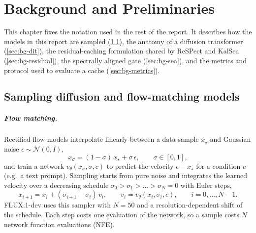 \chapter{Background and Preliminaries}\label{ch:background}

This chapter fixes the notation used in the rest of the report. It describes how the models in this report are sampled (\cref{sec:bg-flow}), the anatomy of a diffusion transformer (\cref{sec:bg-dit}), the residual-caching formulation shared by ReSPect and KalSea (\cref{sec:bg-residual}), the spectrally aligned gate (\cref{sec:bg-sea}), and the metrics and protocol used to evaluate a cache (\cref{sec:bg-metrics}).

\section{Sampling diffusion and flow-matching models}\label{sec:bg-flow}

\paragraph{Flow matching.} Rectified-flow models \citep{lipman2023flow,liu2023rectifiedflow,albergo2023stochastic,esser2024sd3} interpolate linearly between a data sample $x_\star$ and Gaussian noise $\epsilon\sim\mathcal N(0,I)$,
\begin{equation}
  x_\sigma = (1-\sigma)\,x_\star + \sigma\,\epsilon, \qquad \sigma\in[0,1],
\end{equation}
and train a network $v_\theta(x_\sigma,\sigma,c)$ to predict the velocity $\epsilon - x_\star$ for a condition $c$ (e.g.\ a text prompt). Sampling starts from pure noise and integrates the learned velocity over a decreasing schedule $\sigma_0>\sigma_1>\dots>\sigma_N=0$ with Euler steps,
\begin{equation}\label{eq:bg-euler}
  x_{i+1} = x_i + (\sigma_{i+1}-\sigma_i)\, v_i, \qquad v_i = v_\theta(x_i,\sigma_i,c), \qquad i=0,\dots,N-1 .
\end{equation}
FLUX.1-dev uses this sampler with $N=50$ and a resolution-dependent shift of the schedule. Each step costs one evaluation of the network, so a sample costs $N$ network function evaluations (NFE).

